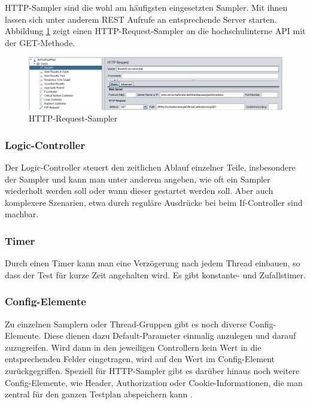 \documentclass[a4paper,12pt]{article}
\begin{document}
HTTP-Sampler sind die wohl am häufigsten eingesetzten Sampler. Mit ihnen lassen sich unter anderem REST Aufrufe an entsprechende Server starten. Abbildung \ref{fig:http_request_sampler} zeigt einen HTTP-Request-Sampler an die hochschulinterne API mit der GET-Methode.

\begin{figure}[htb]%
 \centering
    \includegraphics[width=1\textwidth]{bilder/http_request_sampler.png}
  \caption{HTTP-Request-Sampler}
  \label{fig:http_request_sampler}
\end{figure}

\subsubsection{Logic-Controller}
Der Logic-Controller steuert den zeitlichen Ablauf einzelner Teile, insbesondere der Sampler und kann man unter anderem angeben, wie oft ein Sampler wiederholt werden soll oder wann dieser gestartet werden soll. Aber auch komplexere Szenarien, etwa durch reguläre Ausdrücke bei beim If-Controller sind machbar.

\subsubsection{Timer}
Durch einen Timer kann man eine Verzögerung nach jedem Thread einbauen, so dass der Test für kurze Zeit angehalten wird. Es gibt konstante- und Zufallstimer.

\subsubsection{Config-Elemente}
Zu einzelnen Samplern oder Thread-Gruppen gibt es noch diverse Config-Elemente. Diese dienen dazu Default-Parameter einmalig anzulegen und darauf zuzugreifen. Wird dann in den jeweiligen Controllern kein Wert in die entsprechenden Felder eingetragen, wird auf den Wert im Config-Element zurückgegriffen. Speziell für HTTP-Sampler gibt es darüber hinaus noch weitere Config-Elemente, wie Header, Authorization oder Cookie-Informationen, die man zentral für den ganzen Testplan abspeichern kann \cite{online:performanceTools}.
\end{document}
